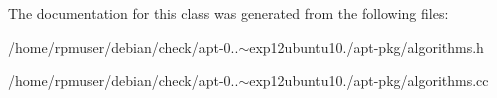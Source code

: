 \-The documentation for this class was generated from the following files\-:\begin{DoxyCompactItemize}
\item 
/home/rpmuser/debian/check/apt-\/0..$\sim$exp12ubuntu10./apt-\/pkg/algorithms.\-h\item 
/home/rpmuser/debian/check/apt-\/0..$\sim$exp12ubuntu10./apt-\/pkg/algorithms.\-cc\end{DoxyCompactItemize}
